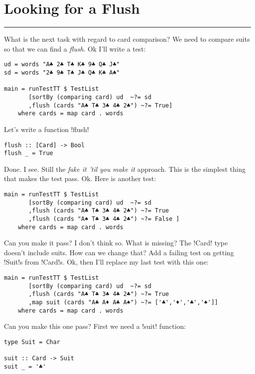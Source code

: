 \newpage
\section{Looking for a Flush} 
\vspace{10cm}
\hrule

\lhQ What is the next task with regard to card comparison?
\lhA We need to compare suits so that we can find a \emph{flush}.
\lhN Ok I'll write a test:
\begin{lstlisting}[frame=single]
ud = words "A♣ 2♣ T♣ K♣ 9♣ Q♣ J♣"
sd = words "2♣ 9♣ T♣ J♣ Q♣ K♣ A♣"

main = runTestTT $ TestList 
       [sortBy (comparing card) ud  ~?= sd
       ,flush (cards "A♣ T♣ 3♣ 4♣ 2♣") ~?= True]
    where cards = map card . words
\end{lstlisting} %
\hspace*{\fill}
\lhA \error Let's write a function \il!flush!
\begin{lstlisting}[frame=single]
flush :: [Card] -> Bool
flush _ = True
\end{lstlisting}
\success Done.
\lhN I see. Still the \emph{fake it 'til you make it} approach.
\lhA This is the simplest thing that makes the test pass.
\lhN Ok. Here is another test:
\begin{lstlisting}[frame=single]
main = runTestTT $ TestList 
       [sortBy (comparing card) ud  ~?= sd
       ,flush (cards "A♣ T♣ 3♣ 4♣ 2♣") ~?= True
       ,flush (cards "A♠ T♣ 3♣ 4♣ 2♣") ~?= False ]
    where cards = map card . words
\end{lstlisting} %
Can you make it pass?
\lhA \failure I don't think so.
\lhN What is missing?
\lhA The \il!Card! type doesn't include suits.
\lhN How can we change that?
\lhA Add a failing test on getting \il!Suit!s from \il!Card!s.
\lhN Ok, then I'll replace my last test with this one:
\begin{lstlisting}[frame=single]
main = runTestTT $ TestList 
       [sortBy (comparing card) ud  ~?= sd
       ,flush (cards "A♣ T♣ 3♣ 4♣ 2♣") ~?= True
       ,map suit (cards "A♣ A♦ A♣ A♠") ~?= ['♣','♦','♣','♠']]
    where cards = map card . words
\end{lstlisting} %
Can you make this one pass?  
\lhA \error First we need a \il!suit! function:
\begin{lstlisting}[frame=single]
type Suit = Char

suit :: Card -> Suit
suit _ = '♣'
\end{lstlisting}
